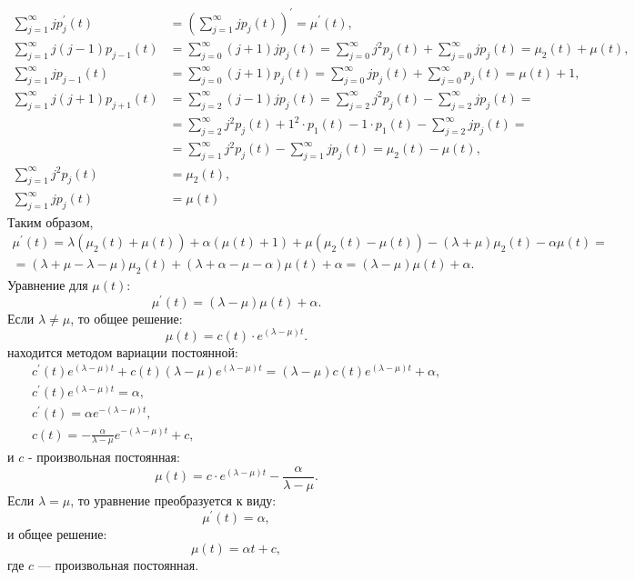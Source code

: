 \documentclass[12pt]{article}
\begin{document}
    \begin{align*}
        \sum_{j=1}^\infty j p_j^{\prime}(t) &
        = \left ( \sum_{j=1}^\infty j p_j(t) \right )^\prime
        = \mu^\prime(t), \\
        \sum_{j=1}^\infty j (j-1) p_{j-1}(t) &
        = \sum_{j=0}^\infty (j+1) j p_j(t)
        = \sum_{j=0}^\infty j^2 p_j(t) + \sum_{j=0}^\infty j p_j(t)
        = \mu_2(t) + \mu(t) , \\
        \sum_{j=1}^\infty j p_{j-1}(t) &
        = \sum_{j=0}^\infty (j+1) p_j(t)
        = \sum_{j=0}^\infty j p_j(t) + \sum_{j=0}^\infty p_j(t)
        = \mu(t) + 1 , \\
        \sum_{j=1}^\infty j (j+1) p_{j+1}(t) &
        = \sum_{j=2}^\infty (j-1) j p_j(t)
        = \sum_{j=2}^\infty j^2 p_j(t) - \sum_{j=2}^\infty j p_j(t) = \\ &
        = \sum_{j=2}^\infty j^2 p_j(t) + 1^2 \cdot p_1(t) - 1 \cdot p_1(t) - \sum_{j=2}^\infty j p_j(t) = \\ &
        = \sum_{j=1}^\infty j^2 p_j(t) - \sum_{j=1}^\infty j p_j(t)
        = \mu_2(t) - \mu(t) , \\
        \sum_{j=1}^\infty j^2 p_j(t) &
        = \mu_2(t), \\
        \sum_{j=1}^\infty j p_j(t) &
        = \mu(t)
    \end{align*}
    Таким образом,
    \begin{multline*}
        \mu^{\prime}(t)
        = \lambda ( \mu_2(t) + \mu(t) ) + \alpha ( \mu(t) + 1 ) + \mu ( \mu_2(t) - \mu(t) ) - ( \lambda + \mu ) \mu_2(t) - \alpha \mu(t) = \\
        = ( \lambda + \mu - \lambda - \mu ) \mu_2(t) + ( \lambda + \alpha - \mu - \alpha ) \mu(t) + \alpha
        = ( \lambda - \mu ) \mu(t) + \alpha .
    \end{multline*}
    Уравнение для $\mu(t)$:
    \[
        \mu^{\prime}(t) = ( \lambda - \mu ) \mu(t) + \alpha .
    \]
    Если $\lambda \neq \mu$, то общее решение:
    \[
        \mu(t) = c(t) \cdot e^{(\lambda - \mu) t} .
    \]
    находится методом вариации постоянной:
    \begin{gather*}
        c^{\prime}(t) e^{(\lambda - \mu) t} + c(t) (\lambda - \mu) e^{(\lambda - \mu) t} = ( \lambda - \mu ) c(t) e^{(\lambda - \mu) t} + \alpha , \\
        c^{\prime}(t) e^{(\lambda - \mu) t} = \alpha , \\
        c^{\prime}(t) = \alpha e^{- (\lambda - \mu) t} , \\
        c(t) = - \frac{\alpha}{\lambda - \mu} e^{- (\lambda - \mu) t} + c ,
    \end{gather*}
    и $c$ - произвольная постоянная:
    \[
        \mu(t) = c \cdot e^{(\lambda - \mu) t} - \frac{\alpha}{\lambda - \mu}.
    \]
    Если $\lambda = \mu$, то уравнение преобразуется к виду:
    \[
        \mu^{\prime}(t) = \alpha ,
    \]
    и общее решение:
    \[
        \mu(t) = \alpha t + c,
    \]
    где $c$ --- произвольная постоянная.
\end{document}
